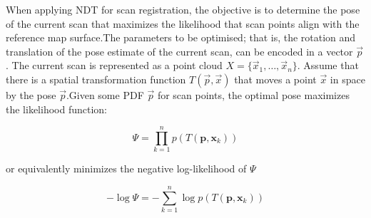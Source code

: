 When applying NDT for scan registration, the objective is to determine the pose of the current scan that maximizes the likelihood that scan points align with the reference map surface.The parameters to be optimised; that is, the rotation and translation of the pose estimate of the current scan, can be encoded in a vector $\vec{p}$. The current scan is represented as a point cloud $X = \{\vec{x}_1, \dots, \vec{x}_n\}$. Assume that there is a spatial transformation function $T(\vec{p}, \vec{x})$ that moves a point $\vec{x}$ in space by the pose $\vec{p}$.Given some PDF $\vec{p}$ for scan points, the optimal pose  maximizes the likelihood function:


\begin{equation}
\Psi = \prod_{k=1}^{n} p(T(\mathbf{p}, \mathbf{x}_k))
\end{equation}

or equivalently minimizes the negative log-likelihood of $\Psi$

\begin{equation}
-\log \Psi = -\sum_{k=1}^{n} \log p(T(\mathbf{p}, \mathbf{x}_k))
\end{equation}

    


